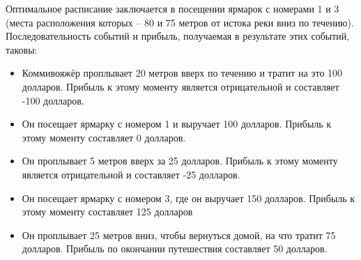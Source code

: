 Оптимальное расписание заключается в посещении ярмарок с номерами 1 и 3 (места расположения
которых -- 80 и 75 метров от истока реки вниз по течению). Последовательность событий и прибыль, получаемая в результате этих событий, таковы:
\begin{itemize}
\item Коммивояжёр проплывает 20 метров вверх по течению и тратит на это 100 долларов. Прибыль к этому моменту является отрицательной и составляет -100 долларов.
\item Он посещает ярмарку с номером 1 и выручает 100 долларов. Прибыль к этому моменту составляет 0 долларов.
\item Он проплывает 5 метров вверх за 25 долларов. Прибыль к этому моменту является отрицательной и составляет -25 долларов.
\item Он посещает ярмарку с номером 3, где он выручает 150 долларов. Прибыль к этому моменту составляет 125 долларов
\item Он проплывает 25 метров вниз, чтобы вернуться домой, на что тратит 75 долларов. Прибыль по окончании путешествия составляет 50 долларов.
\end{itemize}